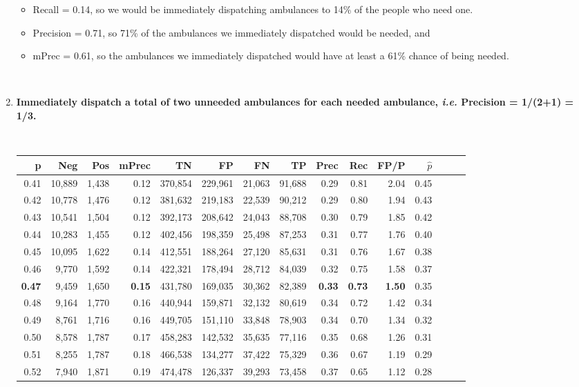 \begin{enumerate}
\begin{itemize}
	\item Recall = 0.14, so we would be immediately dispatching ambulances to 14\% of the people who need one.  
	\item Precision = 0.71, so 71\% of the ambulances we immediately dispatched would be needed, and 
	\item mPrec = 0.61, so the ambulances we immediately dispatched would have at least a 61\% chance of being needed.  
\end{itemize}

	  
	\
	
	\item {\bf Immediately dispatch a total of two unneeded ambulances for each needed ambulance, {\it i.e.} Precision = 1/(2+1) = 1/3.}
	
	\
	
\begin{tabular}{rrrrrrrrrrrrrrr}
\toprule
p &     Neg &    Pos & mPrec &       TN &       FP &       FN &       TP &  Prec &   Rec &  FP/P & $\hat{p}$ \\
\midrule
0.41 &  10,889 &  1,438 &  0.12 &  370,854 &  229,961 &   21,063 &   91,688 &  0.29 &  0.81 &  2.04 &      0.45 \\
0.42 &  10,778 &  1,476 &  0.12 &  381,632 &  219,183 &   22,539 &   90,212 &  0.29 &  0.80 &  1.94 &      0.43 \\
0.43 &  10,541 &  1,504 &  0.12 &  392,173 &  208,642 &   24,043 &   88,708 &  0.30 &  0.79 &  1.85 &      0.42 \\
0.44 &  10,283 &  1,455 &  0.12 &  402,456 &  198,359 &   25,498 &   87,253 &  0.31 &  0.77 &  1.76 &      0.40 \\
0.45 &  10,095 &  1,622 &  0.14 &  412,551 &  188,264 &   27,120 &   85,631 &  0.31 &  0.76 &  1.67 &      0.38 \\
0.46 &   9,770 &  1,592 &  0.14 &  422,321 &  178,494 &   28,712 &   84,039 &  0.32 &  0.75 &  1.58 &      0.37 \\
\bf 0.47 &   9,459 &  1,650 & \bf  0.15 &  431,780 &  169,035 &   30,362 &   82,389 & \bf 0.33 & \bf 0.73 & \bf 1.50 &      0.35 \\
0.48 &   9,164 &  1,770 &  0.16 &  440,944 &  159,871 &   32,132 &   80,619 &  0.34 &  0.72 &  1.42 &      0.34 \\
0.49 &   8,761 &  1,716 &  0.16 &  449,705 &  151,110 &   33,848 &   78,903 &  0.34 &  0.70 &  1.34 &      0.32 \\
0.50 &   8,578 &  1,787 &  0.17 &  458,283 &  142,532 &   35,635 &   77,116 &  0.35 &  0.68 &  1.26 &      0.31 \\
0.51 &   8,255 &  1,787 &  0.18 &  466,538 &  134,277 &   37,422 &   75,329 &  0.36 &  0.67 &  1.19 &      0.29 \\
0.52 &   7,940 &  1,871 &  0.19 &  474,478 &  126,337 &   39,293 &   73,458 &  0.37 &  0.65 &  1.12 &      0.28 \\
\bottomrule
\end{tabular}


\end{enumerate}
